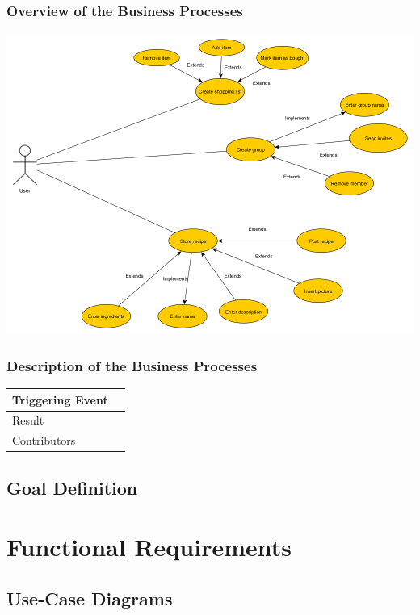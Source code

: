 \documentclass[12pt]{article}
\theoremstyle{definition}
\begin{document}
\subsubsection{Overview of the Business Processes}

\includegraphics[scale=.5]{UseCase.png}

\subsubsection{Description of the Business Processes}

\begin{tabular}{|l|l|}
\hline
Triggering Event &  \\ \hline
Result &  \\ \hline
Contributors &  \\ \hline
\end{tabular}

\subsection{Goal Definition}

\pagebreak

\section{Functional Requirements}

\subsection{Use-Case Diagrams}
\end{document}
